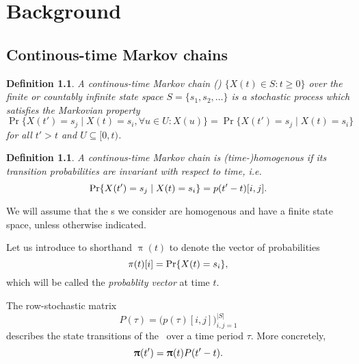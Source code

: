 \documentclass[a4paper,11pt,twoside,openright]{memoir}
\renewcommand*{\vec}[1]{\boldsymbol{\mathrm{#1}}}
\newcommand*{\textabbrev}[1]{\textls[50]{\textsc{#1}}}
\newcommand*{\ctmc}{\textabbrev{ctmc}}
\newcommand{\paren}[1]{\textup(#1\textup)}
\theoremstyle{my}
\newtheorem{dfn}[thm]{Definition}
\begin{document}
\mainmatter

\chapter{Background}

\section{Continous-time Markov chains}

\begin{dfn}
  A \emph{continous-time Markov chain} \paren{\emph{\ctmc}}
  $\{X(t) \in S : t \ge 0\}$ over the finite or countably infinite
  state space $S = \{s_1, s_2, \ldots\}$ is a stochastic process which
  satisfies the Markovian property
  \begin{equation}
    \Pr \{ X(t') = s_{j} \mid X(t) = s_{i}, \forall u \in U : X(u) \}
    = \Pr \{ X(t') = s_{j} \mid X(t) = s_{i} \}
  \end{equation}
  for all $t' > t$ and $U \subseteq [0, t)$.
\end{dfn}

\begin{dfn}
  A continous-time Markov chain is \emph{(time-)homogenous} if its
  transition probabilities are invariant with respect to time, i.e.
  \begin{equation}
    \Pr \{ X(t') = s_{j} \mid X(t) = s_{i} \} = p(t' - t)[i, j] \text.
  \end{equation}
\end{dfn}

We will assume that the \ctmc s we consider are homogenous and have a
finite state space, unless otherwise indicated.

Let us introduce to shorthand $\vec{\uppi}(t)$ to denote the vector of
probabilities
\begin{equation}
  \pi(t)[i] = \Pr\{X(t) = s_i\} \text,
\end{equation}
which will be called the \emph{probablity vector} at time $t$.

The row-stochastic matrix
\begin{equation}
  P(\tau) = \bigl(p(\tau)[i, j]\bigr)_{i, j = 1}^{\lvert S \rvert}
  \label{eq:intro:p_tau}
\end{equation}
describes the state transitions of the \ctmc\ over a time period
$\tau$. More concretely,
\begin{equation}
  \vec{\uppi}(t') = \vec{\uppi}(t) P(t' - t) \text.
\end{equation}
\end{document}
